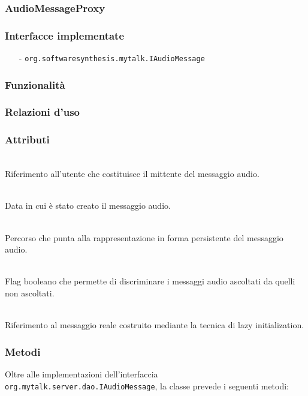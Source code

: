 \subsubsection{AudioMessageProxy}\label{sec:audiomessageproxy}

\subsubsection*{Interfacce implementate}
\begin{itemize}[noitemsep,nolistsep]
  \item[-]\texttt{org.softwaresynthesis.mytalk.IAudioMessage}
\end{itemize}

\subsubsection*{Funzionalità}

\subsubsection*{Relazioni d'uso}

\subsubsection*{Attributi}
\begin{description}
  \item{}\\
Riferimento all'utente che costituisce il mittente del messaggio audio.
  \item{}\\
Data in cui è stato creato il messaggio audio.
  \item{}\\
Percorso che punta alla rappresentazione in forma persistente del messaggio audio.
  \item{}\\
Flag booleano che permette di discriminare i messaggi audio ascoltati da quelli non ascoltati.
  \item{}\\
Riferimento al messaggio reale costruito mediante la tecnica di lazy initialization.
\end{description}

\subsubsection*{Metodi}
Oltre alle implementazioni dell'interfaccia \texttt{org.mytalk.server.dao.IAudioMessage}, la classe prevede i seguenti metodi:
\begin{description}
\item{}\\
\end{description}

